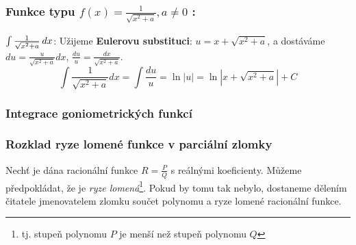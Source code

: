       \subsubsection*{Funkce typu $\boxed{f(x)=\frac{1}{\sqrt{x^2+a}}}, a\neq0$ :}
         \begin{example}\label{ma:ex_sub_metoda1}
           \(\int\frac{1}{\sqrt{x^2+a}}\hspace{2pt}dx\):\vskip0.5mm
           Užijeme \textbf{Eulerovu substituci}: \(u=x+\sqrt{x^2+a}\), a dostáváme
           \(du=\frac{u}{\sqrt{x^2+a}}dx\), \(\frac{du}{u}=\frac{dx}{\sqrt{x^2+a}}\).
           \begin{equation*}
             \int{\frac{1}{\sqrt{x^2+a}}dx}=\int{\frac{du}{u}}=\ln|u|=\ln|x+\sqrt{x^2+a}|+C
           \end{equation*}
         \end{example}
  
    \subsubsection{Integrace goniometrických funkcí}
      
    \subsubsection{Rozklad ryze lomené funkce v parciální zlomky}
      Nechť je dána racionální funkce $R = \frac{P}{Q}$ s reálnými koeficienty. Můžeme
      předpokládat, že je \emph{ryze lomená}\footnote{tj. stupeň polynomu $P$ je menší než
      stupeň polynomu $Q$}. Pokud by tomu tak nebylo, dostaneme dělením čitatele jmenovatelem
      zlomku součet polynomu a ryze lomené racionální funkce.
      
